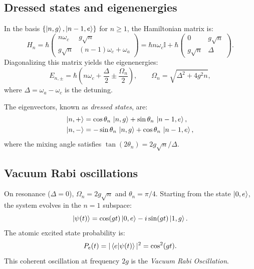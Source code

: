 \documentclass[11pt,a4paper]{article}
\theoremstyle{definition}
\begin{document}
\subsection{Dressed states and eigenenergies}
In the basis $\{\ket{n,g}, \ket{n-1,e}\}$ for $n \ge 1$, the Hamiltonian matrix is:
\begin{equation}
  \hat{H}_n = \hbar
  \begin{pmatrix}
    n\omega_c & g\sqrt{n} \\
    g\sqrt{n} & (n-1)\omega_c + \omega_a
  \end{pmatrix}
  = \hbar n\omega_c \mathbb{I} + \hbar
  \begin{pmatrix}
    0 & g\sqrt{n} \\
    g\sqrt{n} & \Delta
  \end{pmatrix}.
\end{equation}
Diagonalizing this matrix yields the eigenenergies:
\begin{equation}
  E_{n,\pm} = \hbar\left(n\omega_c + \frac{\Delta}{2} \pm \frac{\Omega_n}{2}\right),
  \qquad \Omega_n = \sqrt{\Delta^2 + 4g^2 n},
\end{equation}
where $\Delta = \omega_a - \omega_c$ is the detuning.

The eigenvectors, known as \emph{dressed states}, are:
\begin{align}
  \ket{n,+} &= \cos\theta_n\,\ket{n,g} + \sin\theta_n\,\ket{n-1,e}, \\
  \ket{n,-} &= -\sin\theta_n\,\ket{n,g} + \cos\theta_n\,\ket{n-1,e},
\end{align}
where the mixing angle satisfies $\tan(2\theta_n) = 2g\sqrt{n}/\Delta$.

\subsection{Vacuum Rabi oscillations}
On resonance ($\Delta = 0$), $\Omega_n = 2g\sqrt{n}$ and $\theta_n = \pi/4$.
Starting from the state $\ket{0,e}$, the system evolves in the $n=1$ subspace:
\begin{equation}
  \ket{\psi(t)} = \cos(gt)\ket{0,e} - i\sin(gt)\ket{1,g}.
\end{equation}
The atomic excited state probability is:
\begin{equation}
  P_e(t) = |\braket{e}{\psi(t)}|^2 = \cos^2(gt).
\end{equation}
This coherent oscillation at frequency $2g$ is the \emph{Vacuum Rabi Oscillation}.
\end{document}

